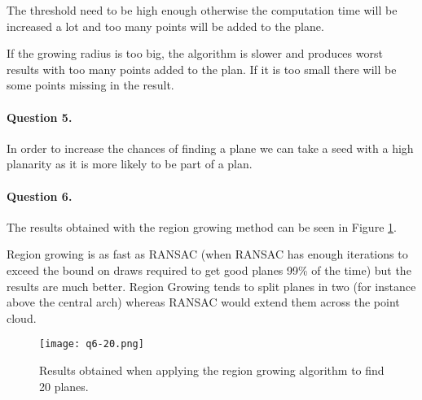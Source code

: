 \documentclass[french]{article}
\begin{document}
	The threshold need to be high enough otherwise the computation time will be increased a lot and too many points will be added to the plane.
	
	If the growing radius is too big, the algorithm is slower and produces worst results with too many points added to the plan. If it is too small there will be some points missing in the result.
	
	\paragraph{Question 5.} 
	In order to increase the chances of finding a plane we can take a seed with a high planarity as it is more likely to be part of a plan.
	
	
	\paragraph{Question 6.} The results obtained with the region growing method can be seen in Figure \ref{fig:q6}.
	
	Region growing is as fast as RANSAC (when RANSAC has enough iterations to exceed the bound on draws required to get good planes 99\% of the time) but the results are much better. Region Growing tends to split planes in two (for instance above the central arch) whereas RANSAC would extend them across the point cloud.
	
	\begin{figure}[h!]
		\centering
		\texttt{[image: q6-20.png]}
		\caption{Results obtained when applying the region growing algorithm to find 20 planes.}
		\label{fig:q6}
	\end{figure}
	
\end{document}
